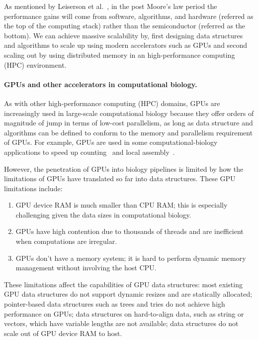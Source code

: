 As mentioned by Leiserson et al.~\cite{leiserson2020there}, in the post Moore’s law period the performance gains will come from software, algorithms, and hardware (referred as the top of the computing stack) rather than the semiconductor (referred as the bottom). We can achieve massive scalability by, first designing data structures and algorithms to scale up using modern accelerators such as GPUs and second scaling out by using distributed memory in an high-performance computing (HPC) environment.


\paragraph{GPUs and other accelerators in computational biology.}
As with other high-performance computing (HPC) domains,
GPUs are increasingly used in large-scale computational biology because they offer orders of magnitude of jump in terms of low-cost parallelism, as long as data structure and algorithms can be defined to conform to the memory and parallelism requirement of GPUs.
%
For example, GPUs are used in some computational-biology applications to speed up \kmer counting~\cite{nisa2021distributed} and local assembly~\cite{awan2021accelerating}.

However, the penetration of GPUs into biology pipelines is limited by how the limitations of GPUs have translated so far into data structures.  These GPU limitations include:
\begin{enumerate}
  \item GPU device RAM is much smaller than CPU RAM; this is especially
    challenging given the data sizes in computational biology.
  \item GPUs have high contention due to thousands of threads and are
    inefficient when computations are irregular.
  \item GPUs don't have a memory system; it is hard to perform dynamic memory management without involving the host CPU.
\end{enumerate}

These limitations affect the capabilities of GPU data structures: most existing GPU data structures do not support dynamic resizes and are statically allocated; pointer-based data structures such as trees and tries do not achieve high performance on GPUs; data structures on hard-to-align data, such as string or vectors, which have variable lengths are not available; data structures do not scale out of GPU device RAM to host.

